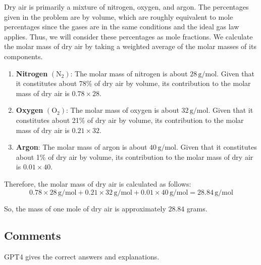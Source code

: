 \documentclass[12pt]{article}
\begin{document}
Dry air is primarily a mixture of nitrogen, oxygen, and argon. The percentages given in the problem are by volume, which are roughly equivalent to mole percentages since the gases are in the same conditions and the ideal gas law applies. Thus, we will consider these percentages as mole fractions. We calculate the molar mass of dry air by taking a weighted average of the molar masses of its components.

\begin{enumerate}
    \item \textbf{Nitrogen} $\left(\mathrm{N}_2\right)$: The molar mass of nitrogen is about $28 \, \text{g/mol}$. Given that it constitutes about 78\% of dry air by volume, its contribution to the molar mass of dry air is $0.78 \times 28$.
    
    \item \textbf{Oxygen} $\left(\mathrm{O}_2\right)$: The molar mass of oxygen is about $32 \, \text{g/mol}$. Given that it constitutes about 21\% of dry air by volume, its contribution to the molar mass of dry air is $0.21 \times 32$.
    
    \item \textbf{Argon}: The molar mass of argon is about $40 \, \text{g/mol}$. Given that it constitutes about 1\% of dry air by volume, its contribution to the molar mass of dry air is $0.01 \times 40$.
\end{enumerate}

Therefore, the molar mass of dry air is calculated as follows:
\[
0.78 \times 28 \, \text{g/mol} + 0.21 \times 32 \, \text{g/mol} + 0.01 \times 40 \, \text{g/mol} = 28.84 \, \text{g/mol}
\]

So, the mass of one mole of dry air is approximately $28.84$ grams.

\subsection*{Comments}

GPT4 gives the correct answers and explanations.
\end{document}
